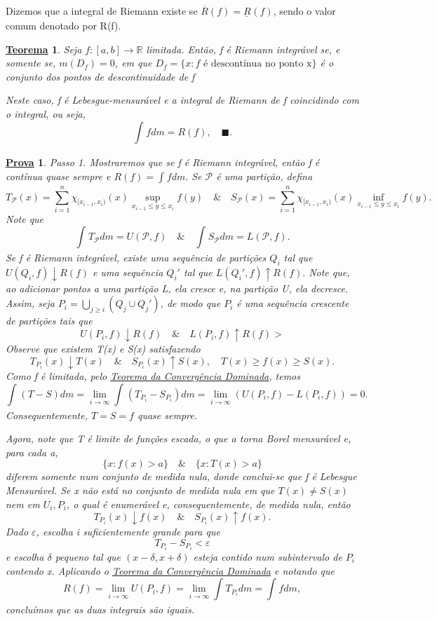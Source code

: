 \documentclass{article}
\newtheorem*{theorem*}{\underline{Teorema}}
\newtheorem*{proof*}{\underline{Prova}}
\renewcommand\qedsymbol{$\blacksquare$}
\begin{document}
  Dizemos que a integral de Riemann existe se \(\overline{R}(f) = \underline{R}_{}(f)\), sendo o valor comum denotado por R(f).
 \begin{theorem*}
   Seja \(f:[a, b]\rightarrow \mathbb{R}\) limitada. Então, f é Riemann integrável se, e somente se, \(m(D_f) = 0\), em que \(D_f = \{x: f \text{ é descontínua no ponto x}\}\) é o conjunto dos pontos 
   de descontinuidade de f 

   Neste caso, f é Lebesgue-mensurável e a integral de Riemann de f coincidindo com o integral, ou seja,
     \[
       \int_{}f dm = R(f),\quad \text{\qedsymbol}.
     \]
 \end{theorem*}
\begin{proof*}
  Passo 1. Mostraremos que se f é Riemann integrável, então f é contínua quase sempre e \(R(f) = \int_{}f dm.\) Se \(\mathcal{P}\) é uma partição, defina 
    \[
      T_{\mathcal{P}}(x) = \sum\limits_{i=1}^{n}\chi_{[x_{i-1}, x_{i})}(x)\sup_{x_{i-1}\leq y\leq x_{i}}f(y) \quad\&\quad S_{\mathcal{P}}(x) = \sum\limits_{i=1}^{n}\chi_{[x_{i-1}, x_{i})}(x)\inf_{x_{i-1}\leq y\leq x_{i}}f(y).
    \]
  Note que 
    \[
      \int_{}T_{\mathcal{P}} dm = U(\mathcal{P}, f) \quad\&\quad \int_{}S_{\mathcal{P}} dm = L(\mathcal{P}, f).
    \]
  Se f é Riemann integrável, existe uma sequência de partições \(Q_{i}\) tal que \(U(Q_{i}, f)\downarrow R(f)\) e uma sequência \(Q_{i}'\) tal que \(L(Q_{i}', f)\uparrow R(f).\) Note que, ao adicionar pontos a uma partição L, ela cresce e, 
  na partição U, ela decresce. Assim, seja \(P_{i} = \bigcup_{j\geq i}^{}(Q_{j}\cup Q_{j}')\), de modo que \(P_{i}\) é uma sequência crescente de partições tais que 
    \[
      U(P_{i}, f)\downarrow R(f)\quad\&\quad L(P_{i}, f)\uparrow R(f)>
    \]
  Observe que existem T(x) e S(x) satisfazendo 
    \[
      T_{P_{i}}(x)\downarrow T(x) \quad\&\quad S_{P_{i}}(x)\uparrow S(x),\quad T(x)\geq f(x)\geq S(x).
    \]
  Como f é limitada, pelo \hyperlink{dominated_convergence}{\textit{Teorema da Convergência Dominada}}, temos 
    \[
      \int_{}(T-S) dm = \lim_{i\to \infty}\int_{}(T_{P_{i}} - S_{P_{i}}) dm = \lim_{i\to \infty}(U(P_{i}, f) - L(P_{i}, f)) = 0.
    \]
  Consequentemente, \(T = S = f\) quase sempre. 

  Agora, note que T é limite de funções escada, o que a torna Borel mensurável e, para cada a, 
    \[
      \{x:f(x)>a\}\quad\&\quad \{x:T(x)>a\}
    \]
  diferem somente num conjunto de medida nula, donde conclui-se que f é Lebesgue Mensurável. Se x não está no conjunto de medida nula em que \(T(x)\neq S(x)\) nem em \(U_{i}, P_{i}\), 
o qual é enumerável e, consequentemente, de medida nula, então 
  \[
    T_{P_{i}}(x)\downarrow f(x) \quad\&\quad S_{P_{i}}(x)\uparrow f(x).
  \]
  Dado \(\varepsilon \), escolha i suficientemente grande para que 
    \[
      T_{P_{i}} - S_{P_{i}} < \varepsilon 
    \]
  e escolha \(\delta \) pequeno tal que \((x-\delta , x+\delta )\) esteja contido num subintervalo de \(P_{i}\) contendo x. Aplicando o \hyperlink{dominated_convergence}{\textit{Teorema da Convergência Dominada}} e notando que 
    \[
      R(f) = \lim_{i\to \infty}U(P_{i}, f) = \lim_{i\to \infty}\int_{}T_{P_{i}} dm = \int_{}f dm,
    \]
  concluímos que as duas integrais são iguais.


\end{proof*}
\end{document}
